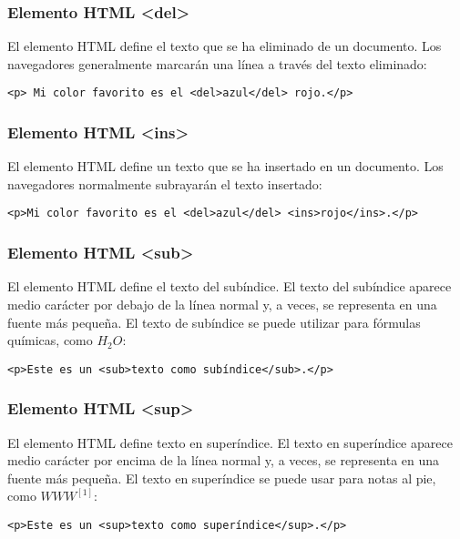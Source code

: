 \begin{frame}[fragile]
  \frametitle{Elemento HTML <del>}

  El elemento HTML  define el texto que se ha eliminado
  de un documento. Los navegadores generalmente marcarán una línea
  a través del texto eliminado:

  \vspace{\baselineskip}
  \begin{lstlisting}
<p> Mi color favorito es el <del>azul</del> rojo.</p>
  \end{lstlisting}
\end{frame}

\begin{frame}[fragile]
  \frametitle{Elemento HTML <ins>}

  El elemento HTML  define un texto que se ha insertado
  en un documento. Los navegadores normalmente subrayarán el texto
  insertado:

  \vspace{\baselineskip}
  \begin{lstlisting}
<p>Mi color favorito es el <del>azul</del> <ins>rojo</ins>.</p>
  \end{lstlisting}
\end{frame}

\begin{frame}[fragile]
  \frametitle{Elemento HTML <sub>}

  El elemento HTML  define el texto del subíndice.
  El texto del subíndice aparece medio carácter por debajo de la
  línea normal y, a veces, se representa en una fuente más pequeña.
  El texto de subíndice se puede utilizar para fórmulas químicas,
  como $H_2O$:

  \vspace{\baselineskip}
  \begin{lstlisting}
<p>Este es un <sub>texto como subíndice</sub>.</p>
  \end{lstlisting}
\end{frame}

\begin{frame}[fragile]
  \frametitle{Elemento HTML <sup>}

  El elemento HTML  define texto en superíndice.
  El texto en superíndice aparece medio carácter por encima de
  la línea normal y, a veces, se representa en una fuente más
  pequeña. El texto en superíndice se puede usar para notas al
  pie, como $WWW^{[1]}$:

  \vspace{\baselineskip}
  \begin{lstlisting}
<p>Este es un <sup>texto como superíndice</sup>.</p>
  \end{lstlisting}
\end{frame}

